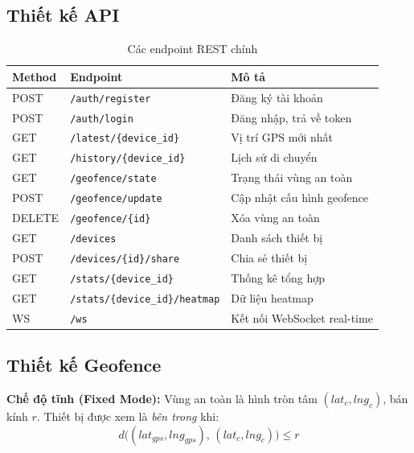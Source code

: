 \documentclass[13pt, a4paper]{report}
\begin{document}
\subsection{Thiết kế API}

\begin{table}[H]
\centering
\caption{Các endpoint REST chính}
\label{tab:api_design}
\begin{tabularx}{\textwidth}{l l X}
\toprule
\textbf{Method} & \textbf{Endpoint} & \textbf{Mô tả} \\
\midrule
POST   & \texttt{/auth/register}            & Đăng ký tài khoản \\
POST   & \texttt{/auth/login}               & Đăng nhập, trả về token \\
GET    & \texttt{/latest/\{device\_id\}}    & Vị trí GPS mới nhất \\
GET    & \texttt{/history/\{device\_id\}}   & Lịch sử di chuyển \\
GET    & \texttt{/geofence/state}           & Trạng thái vùng an toàn \\
POST   & \texttt{/geofence/update}          & Cập nhật cấu hình geofence \\
DELETE & \texttt{/geofence/\{id\}}          & Xóa vùng an toàn \\
GET    & \texttt{/devices}                  & Danh sách thiết bị \\
POST   & \texttt{/devices/\{id\}/share}     & Chia sẻ thiết bị \\
GET    & \texttt{/stats/\{device\_id\}}          & Thống kê tổng hợp \\
GET    & \texttt{/stats/\{device\_id\}/heatmap}  & Dữ liệu heatmap \\
WS     & \texttt{/ws}                       & Kết nối WebSocket real-time \\
\bottomrule
\end{tabularx}
\end{table}

\subsection{Thiết kế Geofence}

\textbf{Chế độ tĩnh (Fixed Mode):} Vùng an toàn là hình tròn tâm $(lat_c, lng_c)$, bán kính $r$. Thiết bị được xem là \textit{bên trong} khi:
\begin{equation}
  d\big((lat_{gps}, lng_{gps}),\,(lat_c, lng_c)\big) \leq r
\end{equation}
\end{document}
